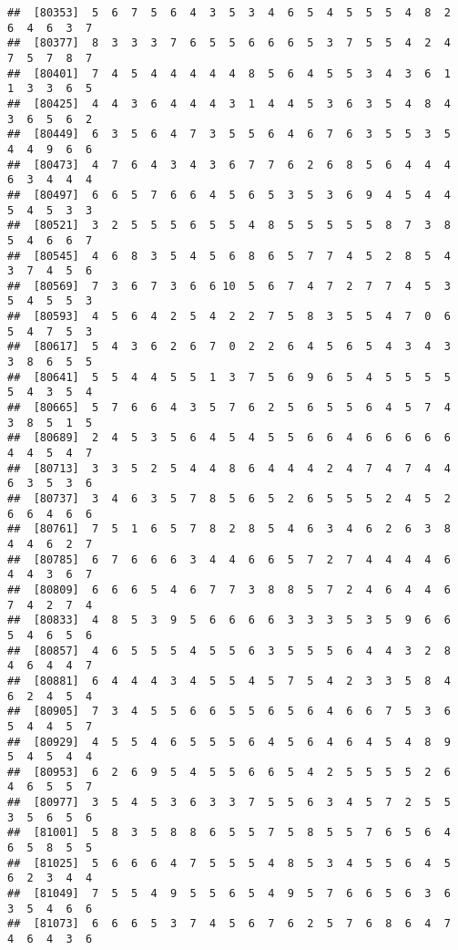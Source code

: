 \documentclass[
]{book}
\begin{document}
\begin{verbatim}
##  [80353]  5  6  7  5  6  4  3  5  3  4  6  5  4  5  5  5  4  8  2  6  4  6  3  7
##  [80377]  8  3  3  3  7  6  5  5  6  6  6  5  3  7  5  5  4  2  4  7  5  7  8  7
##  [80401]  7  4  5  4  4  4  4  4  8  5  6  4  5  5  3  4  3  6  1  1  3  3  6  5
##  [80425]  4  4  3  6  4  4  4  3  1  4  4  5  3  6  3  5  4  8  4  3  6  5  6  2
##  [80449]  6  3  5  6  4  7  3  5  5  6  4  6  7  6  3  5  5  3  5  4  4  9  6  6
##  [80473]  4  7  6  4  3  4  3  6  7  7  6  2  6  8  5  6  4  4  4  6  3  4  4  4
##  [80497]  6  6  5  7  6  6  4  5  6  5  3  5  3  6  9  4  5  4  4  5  4  5  3  3
##  [80521]  3  2  5  5  5  6  5  5  4  8  5  5  5  5  5  8  7  3  8  5  4  6  6  7
##  [80545]  4  6  8  3  5  4  5  6  8  6  5  7  7  4  5  2  8  5  4  3  7  4  5  6
##  [80569]  7  3  6  7  3  6  6 10  5  6  7  4  7  2  7  7  4  5  3  5  4  5  5  3
##  [80593]  4  5  6  4  2  5  4  2  2  7  5  8  3  5  5  4  7  0  6  5  4  7  5  3
##  [80617]  5  4  3  6  2  6  7  0  2  2  6  4  5  6  5  4  3  4  3  3  8  6  5  5
##  [80641]  5  5  4  4  5  5  1  3  7  5  6  9  6  5  4  5  5  5  5  5  4  3  5  4
##  [80665]  5  7  6  6  4  3  5  7  6  2  5  6  5  5  6  4  5  7  4  3  8  5  1  5
##  [80689]  2  4  5  3  5  6  4  5  4  5  5  6  6  4  6  6  6  6  6  4  4  5  4  7
##  [80713]  3  3  5  2  5  4  4  8  6  4  4  4  2  4  7  4  7  4  4  6  3  5  3  6
##  [80737]  3  4  6  3  5  7  8  5  6  5  2  6  5  5  5  2  4  5  2  6  6  4  6  6
##  [80761]  7  5  1  6  5  7  8  2  8  5  4  6  3  4  6  2  6  3  8  4  4  6  2  7
##  [80785]  6  7  6  6  6  3  4  4  6  6  5  7  2  7  4  4  4  4  6  4  4  3  6  7
##  [80809]  6  6  6  5  4  6  7  7  3  8  8  5  7  2  4  6  4  4  6  7  4  2  7  4
##  [80833]  4  8  5  3  9  5  6  6  6  6  3  3  3  5  3  5  9  6  6  5  4  6  5  6
##  [80857]  4  6  5  5  5  4  5  5  6  3  5  5  5  6  4  4  3  2  8  4  6  4  4  7
##  [80881]  6  4  4  4  3  4  5  5  4  5  7  5  4  2  3  3  5  8  4  6  2  4  5  4
##  [80905]  7  3  4  5  5  6  6  5  5  6  5  6  4  6  6  7  5  3  6  5  4  4  5  7
##  [80929]  4  5  5  4  6  5  5  5  6  4  5  6  4  6  4  5  4  8  9  5  4  5  4  4
##  [80953]  6  2  6  9  5  4  5  5  6  6  5  4  2  5  5  5  5  2  6  4  6  5  5  7
##  [80977]  3  5  4  5  3  6  3  3  7  5  5  6  3  4  5  7  2  5  5  3  5  6  5  6
##  [81001]  5  8  3  5  8  8  6  5  5  7  5  8  5  5  7  6  5  6  4  6  5  8  5  5
##  [81025]  5  6  6  6  4  7  5  5  5  4  8  5  3  4  5  5  6  4  5  6  2  3  4  4
##  [81049]  7  5  5  4  9  5  5  6  5  4  9  5  7  6  6  5  6  3  6  3  5  4  6  6
##  [81073]  6  6  6  5  3  7  4  5  6  7  6  2  5  7  6  8  6  4  7  4  6  4  3  6

\end{verbatim}
\end{document}
